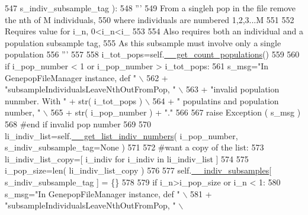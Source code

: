 \begin{DoxyCode}
547                                                     s\_indiv\_subsample\_tag ):
548         \textcolor{stringliteral}{'''}
549 \textcolor{stringliteral}{        From a singleh pop in the file remove the nth of M individuals, }
550 \textcolor{stringliteral}{        where individuals are numbered 1,2,3...M}
551 \textcolor{stringliteral}{}
552 \textcolor{stringliteral}{        Requires value for i\_n, 0<i\_n<i\_}
553 \textcolor{stringliteral}{}
554 \textcolor{stringliteral}{        Also requires both an individual and a population subsample tag,}
555 \textcolor{stringliteral}{        As this subsample must involve only a single population}
556 \textcolor{stringliteral}{        '''}
557     
558         i\_tot\_pops=self.\hyperlink{classnegui_1_1genepopfilemanager_1_1GenepopFileManager_a51f6dcbd17c80f8e61114b11283b655f}{\_\_get\_count\_populations}()
559 
560         \textcolor{keywordflow}{if} i\_pop\_number < 1 \textcolor{keywordflow}{or} i\_pop\_number > i\_tot\_pops:
561             s\_msg=\textcolor{stringliteral}{"In GenepopFileManager instance, def "} \(\backslash\)
562                     + \textcolor{stringliteral}{"subsampleIndividualsLeaveNthOutFromPop, "} \(\backslash\)
563                     + \textcolor{stringliteral}{"invalid population nunmber.  With "} + str( i\_tot\_pops ) \(\backslash\)
564                     + \textcolor{stringliteral}{" populatins and  population number, "} \(\backslash\)
565                     + str( i\_pop\_number ) + \textcolor{stringliteral}{"."}
566 
567             \textcolor{keywordflow}{raise} Exception ( s\_msg )
568         \textcolor{comment}{#end if invalid pop number}
569 
570         li\_indiv\_list=self.\hyperlink{classnegui_1_1genepopfilemanager_1_1GenepopFileManager_a4615769e9db90aa477aa3fd865408f54}{\_\_get\_list\_indiv\_numbers}( i\_pop\_number, 
      s\_indiv\_subsample\_tag=\textcolor{keywordtype}{None} )
571 
572         \textcolor{comment}{#want a copy of the list:}
573         li\_indiv\_list\_copy=[ i\_indiv \textcolor{keywordflow}{for} i\_indiv \textcolor{keywordflow}{in} li\_indiv\_list ]
574 
575         i\_pop\_size=len( li\_indiv\_list\_copy )
576 
577         self.\hyperlink{classnegui_1_1genepopfilemanager_1_1GenepopFileManager_a1e8379bcee4902ca9314ff53fcb71644}{\_\_indiv\_subsamples}[ s\_indiv\_subsample\_tag ] = \{\}
578 
579         \textcolor{keywordflow}{if} i\_n>i\_pop\_size \textcolor{keywordflow}{or} i\_n < 1:
580             s\_msg=\textcolor{stringliteral}{"In GenepopFileManager instance, def "} \(\backslash\)
581                     + \textcolor{stringliteral}{"subsampleIndividualsLeaveNthOutFromPop, "} \(\backslash\)

\end{DoxyCode}
